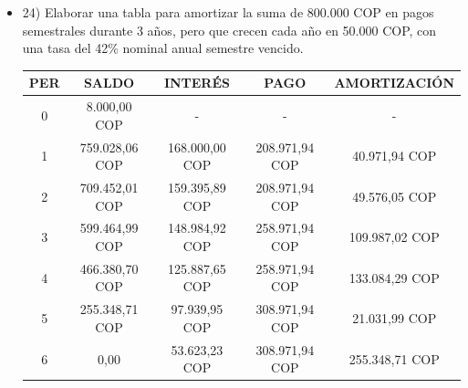 \begin{itemize}
 \item 24)	 Elaborar una tabla para amortizar la suma de 800.000 COP en pagos semestrales durante 3 años, pero que crecen cada año en 50.000 COP, con una tasa del 42\% nominal anual semestre vencido.\\
      \begin{center}
        \begin{tabular}{| c | c | c | c | c |}\hline
           \textbf{PER} & \textbf{SALDO} & \textbf{INTERÉS} & \textbf{PAGO} & \textbf{AMORTIZACIÓN}  \\ \hline
        0 & 8.000,00 COP & - & - & -  \\ \hline
        1 & 759.028,06 COP & 168.000,00 COP & 208.971,94 COP & 40.971,94 COP \\ \hline
        2 & 709.452,01 COP & 159.395,89 COP & 208.971,94 COP & 49.576,05 COP \\ \hline
        3 & 599.464,99 COP & 148.984,92 COP & 258.971,94 COP & 109.987,02 COP \\ \hline
        4 & 466.380,70 COP & 125.887,65 COP & 258.971,94 COP & 133.084,29 COP \\ \hline
        5 & 255.348,71 COP & 97.939,95 COP & 308.971,94 COP & 21.031,99 COP \\ \hline
        6 & 0,00 & 53.623,23 COP & 308.971,94 COP & 255.348,71 COP \\ \hline
        \end{tabular}\\
        \end{center}


\end{itemize}
